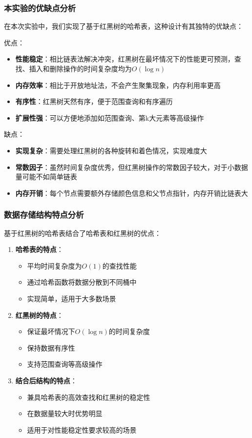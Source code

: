 \documentclass[12pt,a4paper]{article}
\begin{document}
\subsubsection{本实验的优缺点分析}
在本次实验中，我们实现了基于红黑树的哈希表，这种设计有其独特的优缺点：

优点：
\begin{itemize}
\item \textbf{性能稳定}：相比链表法解决冲突，红黑树在最坏情况下的性能更可预测，查找、插入和删除操作的时间复杂度均为$O(\log n)$
\item \textbf{内存效率}：相比于开放地址法，不会产生聚集现象，内存利用率更高
\item \textbf{有序性}：红黑树天然有序，便于范围查询和有序遍历
\item \textbf{扩展性强}：可以方便地添加如范围查询、第k大元素等高级操作
\end{itemize}

缺点：
\begin{itemize}
\item \textbf{实现复杂}：需要处理红黑树的各种旋转和着色情况，实现难度大
\item \textbf{常数因子}：虽然时间复杂度优秀，但红黑树操作的常数因子较大，对于小数据量可能不如简单链表
\item \textbf{内存开销}：每个节点需要额外存储颜色信息和父节点指针，内存开销比链表大
\end{itemize}

\subsubsection{数据存储结构特点分析}
基于红黑树的哈希表结合了哈希表和红黑树的优点：

\begin{enumerate}
\item \textbf{哈希表的特点}：
  \begin{itemize}
  \item 平均时间复杂度为$O(1)$的查找性能
  \item 通过哈希函数将数据分散到不同桶中
  \item 实现简单，适用于大多数场景
  \end{itemize}
  
\item \textbf{红黑树的特点}：
  \begin{itemize}
  \item 保证最坏情况下$O(\log n)$的时间复杂度
  \item 保持数据有序性
  \item 支持范围查询等高级操作
  \end{itemize}
  
\item \textbf{结合后结构的特点}：
  \begin{itemize}
  \item 兼具哈希表的高效查找和红黑树的稳定性
  \item 在数据量较大时优势明显
  \item 适用于对性能稳定性要求较高的场景
  \end{itemize}
\end{enumerate}
\end{document}
